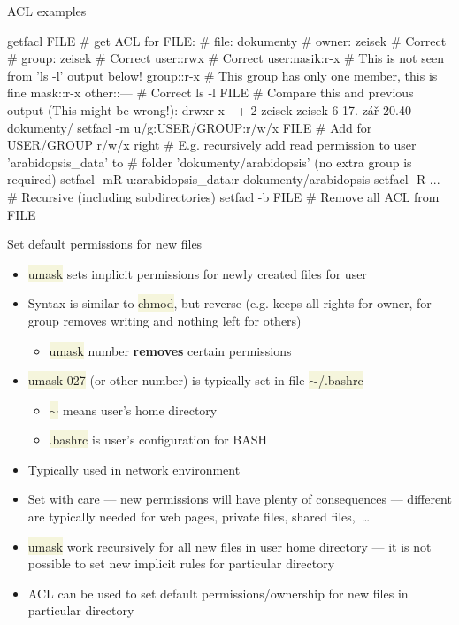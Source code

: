 \documentclass[compress, ucs, xelatex, 11pt, xcolor=svgnames, aspectratio=169,
	hyperref={
		bookmarks=true,
		unicode=true,
		colorlinks=true,
		pdftitle={Linux, command line and MetaCentrum},
		plainpages=false,
		pdfauthor={Vojtech Zeisek},
		pdfsubject={Course about use of Linux command line, writing shell scripts and using MetaCentrum of CESNET},
		pdfcreator={XeLaTeX},
		pdfkeywords={Linux, GNU, BASH, shell, command line, MetaCentrum},
		linkcolor=DarkRed, %
		anchorcolor=DarkBlue, %
		citecolor=Indigo, %
		filecolor=NavyBlue, %
		menucolor=DarkMagenta, %
		urlcolor=DarkBlue, %
		pdftex},
	url={hyphens, lowtilde} %
	]{beamer}
\renewcommand{\texttt}[1]{\colorbox{Beige}{{\ttfamily #1}}}
\begin{document}
\begin{frame}[fragile]{ACL examples}
	\begin{bashcode}
    getfacl FILE # get ACL for FILE:
    # file: dokumenty
    # owner: zeisek # Correct
    # group: zeisek # Correct
    user::rwx       # Correct
    user:nasik:r-x  # This is not seen from 'ls -l' output below!
    group::r-x      # This group has only one member, this is fine
    mask::r-x
    other::---      # Correct
    ls -l FILE # Compare this and previous output (This might be wrong!):
    drwxr-x---+  2 zeisek zeisek     6 17. zář 20.40 dokumenty/
    setfacl -m u/g:USER/GROUP:r/w/x FILE # Add for USER/GROUP r/w/x right
    # E.g. recursively add read permission to user 'arabidopsis_data' to
    # folder 'dokumenty/arabidopsis' (no extra group is required)
    setfacl -mR u:arabidopsis_data:r dokumenty/arabidopsis
    setfacl -R ... # Recursive (including subdirectories)
    setfacl -b FILE # Remove all ACL from FILE
	\end{bashcode}
\end{frame}

\begin{frame}{Set default permissions for new files}
	\begin{itemize}
		\item \texttt{umask} sets implicit permissions for newly created files for user
		\item Syntax is similar to \texttt{chmod}, but reverse (e.g. \texttt{027} keeps all rights for owner, for group removes writing and nothing left for others)
		\begin{itemize}
			\item \texttt{umask} number \textbf{removes} certain permissions
		\end{itemize}
		\item \texttt{umask 027} (or other number) is typically set in file \texttt{$\sim$/.bashrc}
		\begin{itemize}
			\item \texttt{$\sim$} means user's home directory
			\item \texttt{.bashrc} is user's configuration for BASH
		\end{itemize}
		\item Typically used in network environment
		\item Set with care --- new permissions will have plenty of consequences --- different are typically needed for web pages, private files, shared files,~\ldots
		\item \texttt{umask} work recursively for all new files in user home directory --- it is not possible to set new implicit rules for particular directory
		\item ACL can be used to set default permissions/ownership for new files in particular directory
	\end{itemize}
\end{frame}
\end{document}
